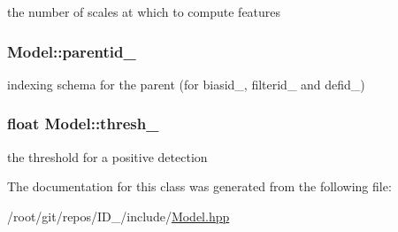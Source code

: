 the number of scales at which to compute features 

\hypertarget{classModel_a4e1151fe7911f52ec75944eff1b257f4}{
\subsubsection[{parentid\-\_\-}]{ {\bf \-Model\-::parentid\-\_\-}}}\label{classModel_a4e1151fe7911f52ec75944eff1b257f4}


indexing schema for the parent (for biasid\-\_\-, filterid\-\_\- and defid\-\_\-) 

\hypertarget{classModel_ac2263c14bbd27a5fed433494354e2b02}{
\subsubsection[{thresh\-\_\-}]{\setlength{\rightskip}{0pt plus 5cm}float {\bf \-Model\-::thresh\-\_\-}}}\label{classModel_ac2263c14bbd27a5fed433494354e2b02}


the threshold for a positive detection 



\-The documentation for this class was generated from the following file\-:\begin{DoxyCompactItemize}
\item 
/root/git/repos/\-I\-D\-\_/include/\hyperlink{Model_8hpp}{\-Model.\-hpp}\end{DoxyCompactItemize}
